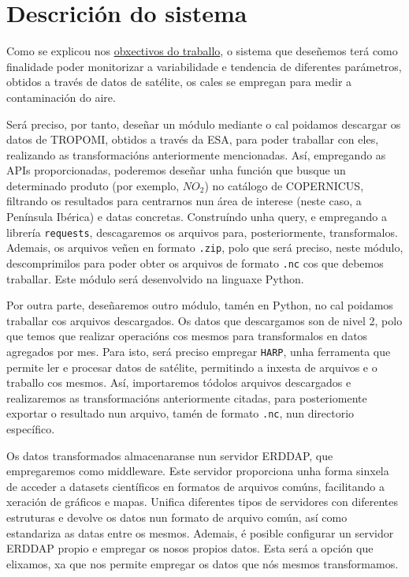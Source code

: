 \section{Descrición do sistema}
Como se explicou nos \hyperref[sec:obxectivos]{obxectivos do traballo}, o sistema que deseñemos terá como finalidade poder monitorizar a variabilidade e tendencia
de diferentes parámetros, obtidos a través de datos de satélite, os cales se empregan para medir a contaminación do aire.

Será preciso, por tanto, deseñar un módulo  mediante o cal poidamos descargar os datos de TROPOMI, obtidos a través da ESA, para poder traballar con eles, realizando
as transformacións anteriormente mencionadas. Así, empregando as APIs proporcionadas, poderemos deseñar unha función que busque un determinado produto (por exemplo,
$NO_{2}$) no catálogo de COPERNICUS, filtrando os resultados para centrarnos nun área de interese (neste caso, a Península Ibérica) e datas concretas. Construíndo unha
query, e empregando a librería \texttt{requests}, descagaremos os arquivos para, posteriormente, transformalos. Ademais, os arquivos veñen en formato \texttt{.zip}, polo que será
preciso, neste módulo, descomprimilos para poder obter os arquivos de formato \texttt{.nc} cos que debemos traballar. Este módulo será desenvolvido na linguaxe Python.

Por outra parte, deseñaremos outro módulo, tamén en Python, no cal poidamos traballar cos arquivos descargados. Os datos que descargamos son de nivel 2, polo que temos que realizar
operacións cos mesmos para transformalos en datos agregados por mes. Para isto, será preciso empregar \texttt{HARP}, unha ferramenta que permite ler e procesar datos de satélite,
permitindo a inxesta de arquivos e o traballo cos mesmos. Así, importaremos tódolos arquivos descargados e realizaremos as transformacións anteriormente citadas, para posteriomente
exportar o resultado nun arquivo, tamén de formato \texttt{.nc}, nun directorio específico.

Os datos transformados almacenaranse nun servidor ERDDAP, que empregaremos como middleware. Este servidor proporciona unha forma sinxela de acceder a datasets científicos en formatos
de arquivos comúns, facilitando a xeración de gráficos e mapas. Unifica diferentes tipos de servidores con diferentes estruturas e devolve os datos nun formato de arquivo común, así
como estandariza as datas entre os mesmos. Ademais, é posible configurar un servidor ERDDAP propio e empregar os nosos propios datos. Esta será a opción que elixamos, xa que nos permite
empregar os datos que nós mesmos transformamos.

